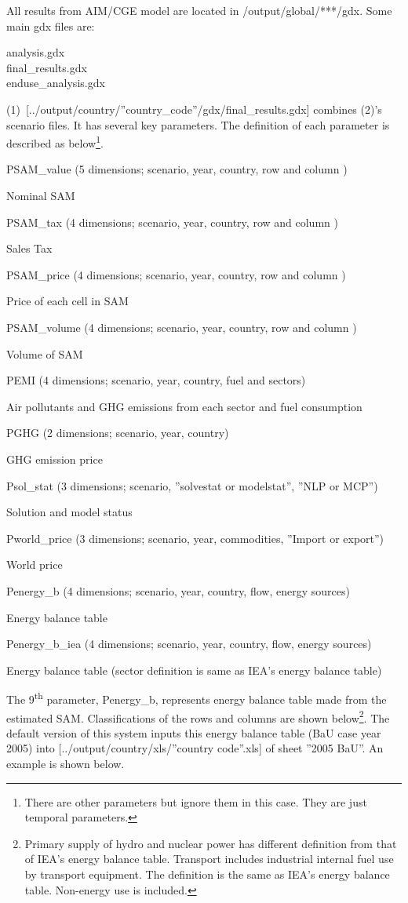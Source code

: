 \documentclass[10pt,a4paper,titlepage,dvipdfmx]{book}
\begin{document}
All results from AIM/CGE model are located in /output/global/***/gdx. Some main gdx files are:
\begin{description}
\item [analysis.gdx]
\item [final\_results.gdx]
\item [enduse\_analysis.gdx]
\end{description}
(1)~[../output/country/''country\_code''/gdx/final\_results.gdx] combines (2)'s scenario files. It has several key parameters. The definition of each parameter is described as below\footnote{There are other parameters but ignore them in this case. They are just temporal parameters.}.
\begin{enumerate}[{[1]}]
\item PSAM\_value (5 dimensions; scenario, year, country, row and column )

Nominal SAM
\item PSAM\_tax (4 dimensions; scenario, year, country, row and column )

Sales Tax
\item PSAM\_price (4 dimensions; scenario, year, country, row and column )

Price of each cell in SAM
\item PSAM\_volume (4 dimensions; scenario, year, country, row and column )

Volume of SAM
\item PEMI (4 dimensions; scenario, year, country, fuel and sectors)

Air pollutants and GHG emissions from each sector and fuel consumption
\item PGHG (2 dimensions; scenario, year, country)

GHG emission price
\item Psol\_stat (3 dimensions; scenario, ''solvestat or modelstat'', ''NLP or MCP'')

Solution and model status
\item Pworld\_price (3 dimensions; scenario, year, commodities, ''Import or export'')

World price
\item Penergy\_b (4 dimensions; scenario, year, country, flow, energy sources)

Energy balance table
\item Penergy\_b\_iea (4 dimensions; scenario, year, country, flow, energy sources)

Energy balance table (sector definition is same as IEA's energy balance table)
\end{enumerate}
The 9\textsuperscript{th} parameter, Penergy\_b, represents energy balance table made from the estimated SAM. Classifications of the rows and columns are shown below\footnote{Primary supply of hydro and nuclear power has different definition from that of IEA's energy balance table. Transport includes industrial internal fuel use by transport equipment. The definition is the same as IEA's energy balance table. Non-energy use is included.}. The default version of this system inputs this energy balance table (BaU case year 2005) into [../output/country/xls/''country code''.xls] of sheet ''2005 BaU''. An example is shown below.
\end{document}
